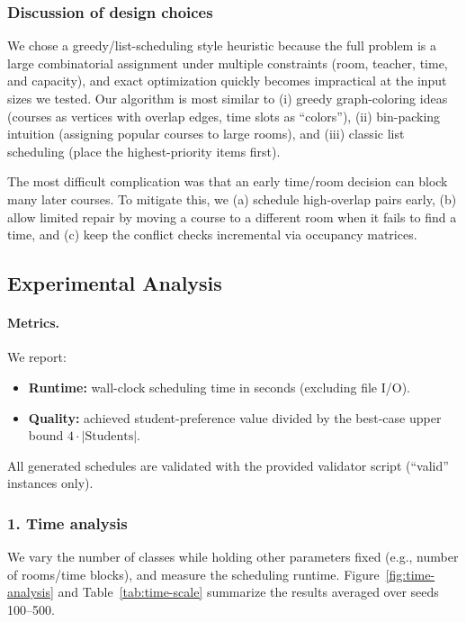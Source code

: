 \subsubsection*{Discussion of design choices}
We chose a greedy/list-scheduling style heuristic because the full problem is a large combinatorial assignment under multiple constraints (room, teacher, time, and capacity), and exact optimization quickly becomes impractical at the input sizes we tested. Our algorithm is most similar to (i) greedy graph-coloring ideas (courses as vertices with overlap edges, time slots as ``colors''), (ii) bin-packing intuition (assigning popular courses to large rooms), and (iii) classic list scheduling (place the highest-priority items first).

The most difficult complication was that an early time/room decision can block many later courses. To mitigate this, we (a) schedule high-overlap pairs early, (b) allow limited repair by moving a course to a different room when it fails to find a time, and (c) keep the conflict checks incremental via occupancy matrices.

\subsection{Experimental Analysis}\label{sec:experiments}

\paragraph{Metrics.}
We report:
\begin{itemize}
  \item \textbf{Runtime:} wall-clock scheduling time in seconds (excluding file I/O).
  \item \textbf{Quality:} achieved student-preference value divided by the best-case upper bound $4\cdot|\text{Students}|$.
\end{itemize}
All generated schedules are validated with the provided validator script (``valid'' instances only).

\subsubsection*{1. Time analysis}
We vary the number of classes while holding other parameters fixed (e.g., number of rooms/time blocks), and measure the scheduling runtime. Figure~\ref{fig:time-analysis} and Table~\ref{tab:time-scale} summarize the results averaged over seeds 100--500.


